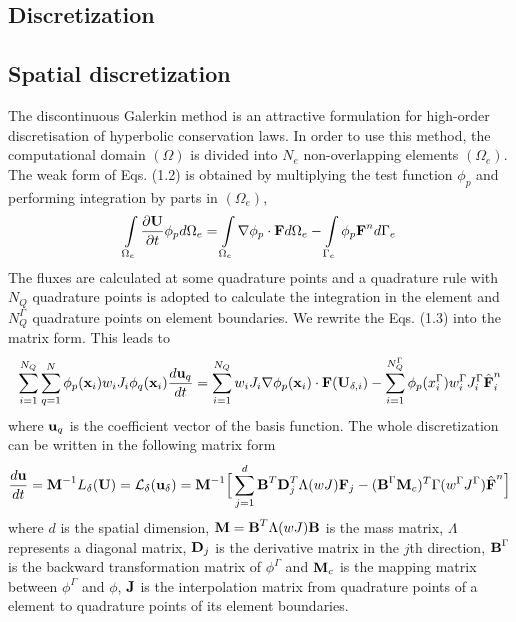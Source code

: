 \subsection{Discretization}
\subsection*{Spatial discretization}
 The discontinuous Galerkin method is an attractive formulation for high-order discretisation of hyperbolic conservation laws. In order to use this method, the computational domain $(\Omega)$ is divided into $N_e$ non-overlapping elements $(\Omega _e)$. The weak form of Eqs. (1.2) is obtained by multiplying the test function $\phi _p$ and performing integration by parts in  $(\Omega _e)$,
\begin{equation}
\int\limits_{\Omega_e}\frac{\partial\textbf U}{\partial t}\phi_pd\Omega_e=\int\limits_{\Omega_e}\nabla\phi_p\cdot\textbf{F}d\Omega_e-\int\limits_{\Gamma_e}\phi_p\textbf{F}^n d\Gamma_e
\end{equation}
The fluxes are calculated at some quadrature points and a quadrature rule with $N_Q$ quadrature points is adopted to calculate the integration in the element and $N_Q^\Gamma$ quadrature points on element boundaries. We rewrite the Eqs. (1.3) into the matrix form. This leads to
\begin{equation}
\sum^{N_Q}_{i=1}\sum^{N}_{q=1}\phi_p(\textbf{x}_i)w_iJ_i\phi_q(\textbf{x}_i)\frac{d\textbf{u}_q}{dt}=\sum^{N_Q}_{i=1}w_iJ_i\nabla\phi_p(\textbf{x}_i)\cdot\textbf{F}(\textbf{U}_{\delta,i})-\sum^{N^\Gamma_Q}_{i=1}\phi_p(x^\Gamma_i)w^\Gamma_iJ^\Gamma_i\hat{\textbf F}^n_i
\end{equation}
where $\textbf u_q$ is the coefficient vector of the basis function. The whole discretization can be written in the following matrix form
\begin{equation}
\frac{d\textbf u}{dt}=\textbf M^{-1}L_{\delta}(\textbf U)=\mathcal{L}_\delta(\textbf u_\delta)\\
=\textbf M^{-1}\Big[\sum^{d}_{j=1}\textbf B^T\textbf D^T_j\Lambda(wJ)\textbf F_j-(\textbf B^\Gamma \textbf M_c)^T\Gamma(w^\Gamma J^\Gamma)\hat{\textbf F}^n\Big]
\end{equation}
where $d$ is the spatial dimension, $\textbf M=\textbf B^T\Lambda(wJ)\textbf B$ is the mass matrix, $\Lambda$ represents a diagonal matrix, $\textbf D_j$ is the derivative matrix in the $j$th direction, $\textbf B^\Gamma$ is the backward transformation matrix of $\phi^\Gamma$ and $\textbf M_c$ is the mapping matrix between $\phi^\Gamma $ and $\phi$, $\textbf J$ is the interpolation matrix from quadrature points of a element to quadrature points of its element boundaries.
